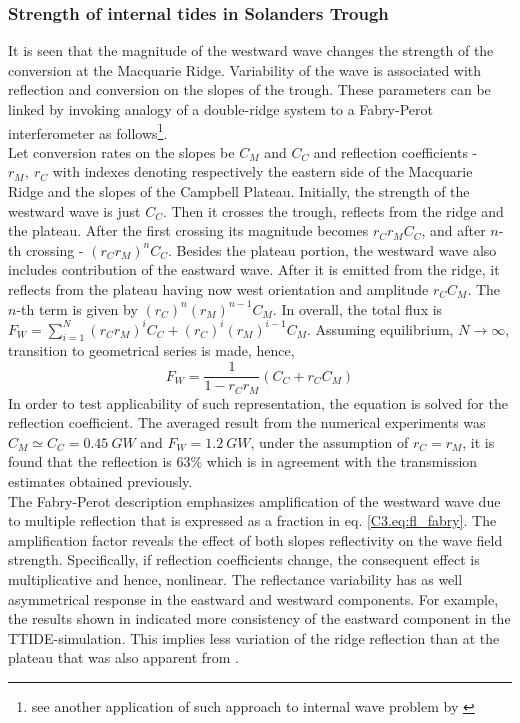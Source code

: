 \documentclass[12pt]{article}
\begin{document}
\subsubsection{Strength of internal tides in Solanders Trough}
\label{C3.sec:disc_sw}
It is seen that the magnitude of the westward wave changes the strength of the 
conversion at the Macquarie Ridge. Variability of the wave is associated with reflection and 
conversion on the slopes of the trough. These parameters can be linked by invoking 
analogy of a 
double-ridge system to a Fabry-Perot interferometer as follows\footnote{see another application of 
such approach to internal wave problem by \cite{mathur2010internal}}.\\

Let conversion rates on the slopes be $C_M$ and $C_C$ and reflection coefficients - $r_M,~r_C$ with 
indexes denoting 
respectively the eastern side of the Macquarie Ridge and the slopes of the Campbell Plateau. 
Initially, the strength of the westward wave is just $C_C$. Then it crosses the trough, reflects 
from the ridge and the plateau. After the first crossing its magnitude becomes $r_C r_M C_C$, and 
after $n$-th crossing - $(r_C r_M)^n C_C$. Besides the plateau portion, the westward wave 
also includes contribution of the eastward wave. After it is emitted from the ridge, it reflects 
from the plateau having now west orientation and amplitude $r_C C_M$. The $n$-th term is given by 
$(r_C)^n (r_M)^{n-1} C_M$. In overall, the total flux is $F_W = \sum_{i = 1}^N (r_C r_M)^i C_C 
+ (r_C)^i (r_M)^{i-1} C_M$. Assuming equilibrium, $N \rightarrow \infty$, transition to 
geometrical series is made, hence,
\begin{equation}
\label{C3.eq:fl_fabry}
F_W = \frac{1}{1 - r_C r_M} (C_C + r_C C_M)
\end{equation}
In order to test applicability of such representation, the equation is solved for the reflection 
coefficient. The averaged result 
from the numerical experiments  was $C_M \simeq C_C = 0.45~GW$ and 
$F_W = 1.2~GW$, under the assumption of $r_C = r_M$, it is found that the reflection is $63\%$ 
which is in agreement with the transmission estimates obtained previously.\\

The Fabry-Perot description emphasizes amplification of the westward wave due to multiple 
reflection that is expressed as a fraction in eq. \eqref{C3.eq:fl_fabry}. The amplification factor 
reveals the effect of both slopes reflectivity on the wave field strength. Specifically, if 
reflection coefficients change, the consequent effect is multiplicative and hence, nonlinear. The 
reflectance 
variability has as well asymmetrical response in the eastward and westward components. For example, 
the 
results shown in  indicated more consistency of the eastward component 
in 
the 
TTIDE-simulation. This implies less variation of the ridge reflection than at the plateau that was 
also apparent from .\\
\end{document}

